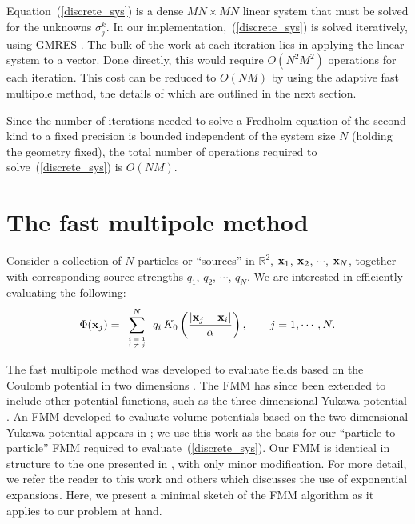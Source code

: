 \documentclass[preprint,12pt]{elsarticle}
\newcommand{\x}{{\bf x}}
\newcommand{\RR}{{\mathbb{R}}}
\newcommand{\eqr}[1]{~(\ref{#1})}
\begin{document}
Equation\eqr{discrete_sys} is a dense $MN\times MN$ linear system that must be solved for the unknowns $\sigma_j^k$. 
In our implementation,\eqr{discrete_sys} is solved iteratively, using GMRES \cite{SAAD}. 
The bulk of the work at each iteration lies in applying the linear system to a vector. 
Done directly, this would require $O(N^2 M^2)$ operations for each iteration. 
This cost can be reduced to $O(NM)$ by using the adaptive fast multipole method, the details of which are outlined in the next section.

Since the number of iterations needed to solve a Fredholm equation of the second kind to a fixed precision is bounded independent of the system size $N$ (holding the geometry fixed), the total number of operations required to solve\eqr{discrete_sys} is $O(NM)$. 

\section{The fast multipole method}
Consider a collection of $N$ particles or ``sources'' in $\RR^{2}$, $\x_1$, $\x_2$, $\cdots$, $\x_{N}$, together with corresponding source strengths $q_1$, $q_2$, $\cdots$, $q_{N}$. 
We are interested in efficiently evaluating the following:
\begin{equation}
     \Phi(\x_j)=\sum^{N}_{\tiny \begin{array}{ll}
                                     i=1 \vspace{-.01in} \\
                                     i\ne j
                                  \end{array}
                                }
    q_{i} \, K_{0}\left(\frac{|\x_{j}-\x_i|}{\alpha}\right), \qquad j = 1, \cdots, N. 
    \label{direct_potential}
 \end{equation}

The fast multipole method was developed to evaluate fields based on the Coulomb potential in two dimensions \cite{CGR,fmm}. 
The FMM has since been extended to include other potential functions, such as the three-dimensional Yukawa potential \cite{screened_coulomb}. 
An FMM developed to evaluate volume potentials based on the two-dimensional Yukawa potential appears in \cite{modified:helmholtz}; we use this work as the basis for our ``particle-to-particle'' FMM required to evaluate\eqr{discrete_sys}. 
Our FMM is identical in structure to the one presented in \cite{modified:helmholtz}, with only minor modification. 
For more detail, we refer the reader to this work and others \cite{screened_coulomb,new_FMM} which discusses the use of exponential expansions. 
Here, we present a minimal sketch of the FMM algorithm as it applies to our problem at hand. 
\end{document}
